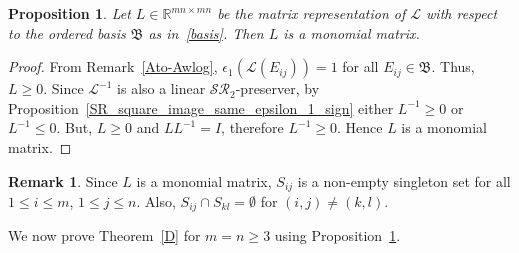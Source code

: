 \documentclass[11pt,reqno]{amsart}
\theoremstyle{plain}
\newtheorem{prop}[theorem]{Proposition}
\theoremstyle{definition}
\newtheorem{rem}[theorem]{Remark}
\numberwithin{equation}{section}
\begin{document}
\begin{prop}\label{SR_square_monomial}
	Let $L\in\mathbb{R}^{mn\times mn}$ be the matrix representation of $\mathcal{L}$ with respect to the ordered basis $\mathfrak{B}$ as in~\eqref{basis}. Then $L$ is a monomial matrix.
\end{prop}

\begin{proof}
	From Remark~\ref{Ato-Awlog}, $\epsilon_1(\mathcal{L}(E_{ij}))=1$ for all $E_{ij}\in\mathfrak{B}$. Thus, $L\geq 0$. Since $\mathcal{L}^{-1}$ is also a linear $\mathcal{SR}_2$-preserver, by Proposition~\ref{SR_square_image_same_epsilon_1_sign} either $L^{-1}\geq 0$ or $L^{-1}\leq 0$. But, $L\geq 0$ and $LL^{-1}=I$, therefore $L^{-1}\geq 0$. Hence $L$ is a monomial matrix.
\end{proof}

\begin{rem}\label{Sij_singleton}
	Since $L$ is a monomial matrix, $S_{ij}$ is a non-empty singleton set for all $1\leq i\leq m$, $1\leq j\leq n$. Also, $S_{ij}\cap S_{kl}=\emptyset$ for $(i,j)\neq(k,l)$.
\end{rem}

We now prove Theorem~\ref{D} for $m=n\geq3$ using Proposition~\ref{SR_square_monomial}.
\end{document}

